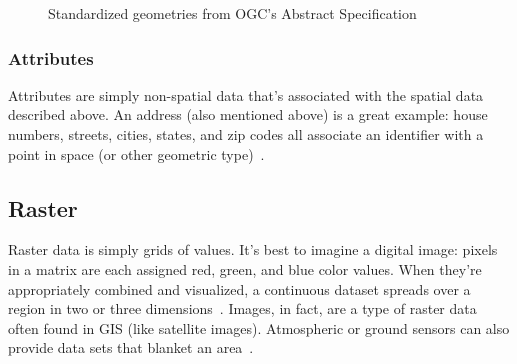 \begin{figure}
    \centering

      \hfill
{}
       \hfill
      \hfill
    \caption{Standardized geometries from OGC's Abstract Specification}
    \label{fig:geoms}
    
\end{figure}

\subsubsection{Attributes}
Attributes are simply non-spatial data that's associated with the spatial data described above. An address (also mentioned above) is a great example: house numbers, streets, cities, states, and zip codes all associate an identifier with a point in space (or other geometric type)~\cite{gentle_intro}.

\subsection{Raster}
Raster data is simply grids of values. It's best to imagine a digital image: pixels in a matrix are each assigned red, green, and blue color values. When they're appropriately combined and visualized, a continuous dataset spreads over a region in two or three dimensions~\cite{gentle_intro}. Images, in fact, are a type of raster data often found in GIS (like satellite images). Atmospheric or ground sensors can also provide data sets that blanket an area~\cite{gentle_intro}.

